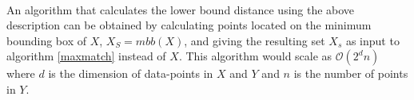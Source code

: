 \documentclass[article,11pt]{article}
\begin{document}
\\
An algorithm that calculates the lower bound distance using the above
description can be obtained by calculating points located on the minimum
bounding box of $X$, $X_S = mbb(X)$, and giving the resulting set $X_s$ as
input to algorithm \ref{maxmatch} instead of $X$. This algorithm would scale as
$\mathcal{O}(2^dn)$ where $d$ is the dimension of data-points in $X$ and $Y$ and
$n$ is the number of points in $Y$.
\end{document}
